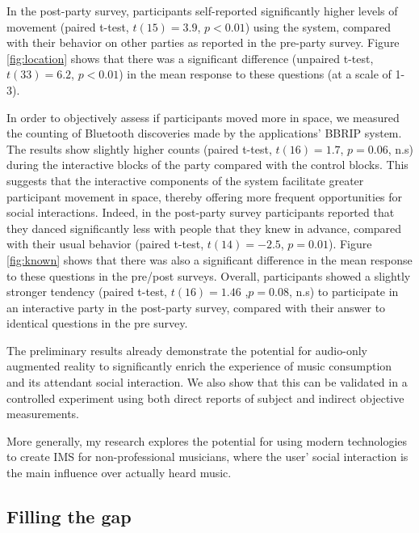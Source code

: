 \documentclass[a4paper,11pt]{article}
\begin{document}
{In the post-party survey, participants self-reported significantly higher levels of movement (paired t-test, $t(15)=3.9$, $p<0.01$) using the system, compared with their behavior on other parties as reported in the pre-party survey.
Figure \ref{fig:location} shows that there was a significant difference (unpaired t-test, $t(33)=6.2$, $p<0.01$) in the mean response to these questions (at a scale of 1-3).

In order to objectively assess if participants moved more in space, we measured the counting of Bluetooth discoveries made by the applications' BBRIP system.
The results show slightly higher counts (paired t-test, $t(16)=1.7$, $p=0.06$, n.s) during the interactive blocks of the party compared with the control blocks. This suggests that the interactive components of the system facilitate greater participant movement in space, thereby offering more frequent opportunities for social interactions.
Indeed, in the post-party survey participants reported that they danced significantly less with people that they knew in advance, compared with their usual behavior (paired t-test, $t(14)=-2.5$, $p=0.01$).
Figure \ref{fig:known} shows that there was also a significant difference in the mean response to these questions in the pre/post surveys.
Overall, participants showed a slightly stronger tendency (paired t-test, $t(16)=1.46$ ,$p=0.08$, n.s) to participate in an interactive party in the post-party survey, compared with their answer to identical questions in the pre survey.

The preliminary results already demonstrate the potential for audio-only augmented reality to significantly enrich the experience of music consumption and its attendant social interaction.
We also show that this can be validated in a controlled experiment using both direct reports of subject and indirect objective measurements.



More generally, my research explores the potential for using modern technologies to create IMS for non-professional musicians, where the user' social interaction is the main influence over actually heard music.

\subsection{Filling the gap}

}
\end{document}
